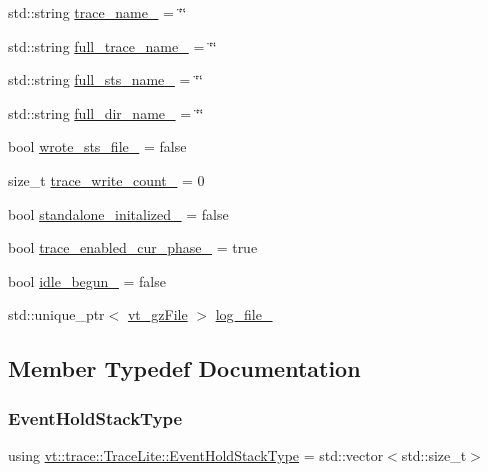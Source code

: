\begin{DoxyCompactItemize}
std\+::string \hyperlink{structvt_1_1trace_1_1_trace_lite_ae6209336c8aabf62ec626fa6b8fbc8ee}{trace\+\_\+name\+\_\+} = \char`\"{}\char`\"{}
\item 
std\+::string \hyperlink{structvt_1_1trace_1_1_trace_lite_a0381e516d389555b3b40b954d276eff9}{full\+\_\+trace\+\_\+name\+\_\+} = \char`\"{}\char`\"{}
\item 
std\+::string \hyperlink{structvt_1_1trace_1_1_trace_lite_aa7236609212e978252ddefd9c0131537}{full\+\_\+sts\+\_\+name\+\_\+} = \char`\"{}\char`\"{}
\item 
std\+::string \hyperlink{structvt_1_1trace_1_1_trace_lite_a3871cf535ca6f31bfb499a46cde4c80c}{full\+\_\+dir\+\_\+name\+\_\+} = \char`\"{}\char`\"{}
\item 
bool \hyperlink{structvt_1_1trace_1_1_trace_lite_a3af89ea00d5dfcf4341aabf9c2b33aef}{wrote\+\_\+sts\+\_\+file\+\_\+} = false
\item 
size\+\_\+t \hyperlink{structvt_1_1trace_1_1_trace_lite_ac4f99b5bd44df7b4aa07b700fab162c7}{trace\+\_\+write\+\_\+count\+\_\+} = 0
\item 
bool \hyperlink{structvt_1_1trace_1_1_trace_lite_a1c41f9e975ef1ba41cc6550bab7b2375}{standalone\+\_\+initalized\+\_\+} = false
\item 
bool \hyperlink{structvt_1_1trace_1_1_trace_lite_ae75d01f083974fe39f81455377ac3842}{trace\+\_\+enabled\+\_\+cur\+\_\+phase\+\_\+} = true
\item 
bool \hyperlink{structvt_1_1trace_1_1_trace_lite_a75ffdb0ab1dea68a665085596ece7b96}{idle\+\_\+begun\+\_\+} = false
\item 
std\+::unique\+\_\+ptr$<$ \hyperlink{structvt_1_1trace_1_1vt__gz_file}{vt\+\_\+gz\+File} $>$ \hyperlink{structvt_1_1trace_1_1_trace_lite_ab074b4892ac4fd0508c03150710eb46d}{log\+\_\+file\+\_\+}
\end{DoxyCompactItemize}


\subsection{Member Typedef Documentation}
\mbox{\label{structvt_1_1trace_1_1_trace_lite_af9e05e83b3d0adfb9d45cf13c0bb7525}} 
\subsubsection{\texorpdfstring{Event\+Hold\+Stack\+Type}{EventHoldStackType}}
{\footnotesize\ttfamily using \hyperlink{structvt_1_1trace_1_1_trace_lite_af9e05e83b3d0adfb9d45cf13c0bb7525}{vt\+::trace\+::\+Trace\+Lite\+::\+Event\+Hold\+Stack\+Type} =  std\+::vector$<$std\+::size\+\_\+t$>$}


